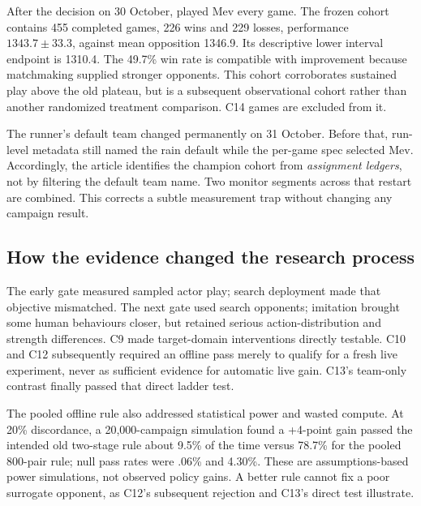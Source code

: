 After the decision on 30 October,  played Mev every game.
The frozen cohort contains 455 completed games, 226 wins and 229 losses,
performance $1343.7\pm33.3$, against mean opposition 1346.9. Its descriptive
lower interval endpoint is 1310.4. The 49.7\% win rate is compatible with
improvement because matchmaking supplied stronger opponents. This cohort
corroborates sustained play above the old plateau, but is a subsequent
observational cohort rather than another randomized treatment comparison.
C14 games are excluded from it.

The runner's default team changed permanently on 31 October. Before that,
run-level metadata still named the rain default while the per-game spec
selected Mev. Accordingly, the article identifies the champion cohort from
\emph{assignment ledgers}, not by filtering the default team name. Two
monitor segments across that restart are combined. This corrects a subtle
measurement trap without changing any campaign result.

\subsection{How the evidence changed the research process}
The early gate measured sampled actor play; search deployment made that
objective mismatched. The next gate used search opponents; imitation brought
some human behaviours closer, but retained serious action-distribution and
strength differences. C9 made target-domain interventions directly testable.
C10 and C12 subsequently required an offline pass merely to qualify for a
fresh live experiment, never as sufficient evidence for automatic live gain.
C13's team-only contrast finally passed that direct ladder test.

The pooled offline rule also addressed statistical power and wasted compute.
At 20\% discordance, a 20,000-campaign simulation found a +4-point gain
passed the intended old two-stage rule about 9.5\% of the time versus 78.7\%
for the pooled 800-pair rule; null pass rates were .06\% and 4.30\%.
These are assumptions-based power simulations, not observed policy gains.
A better rule cannot fix a poor surrogate opponent, as C12's subsequent
rejection and C13's direct test illustrate.

